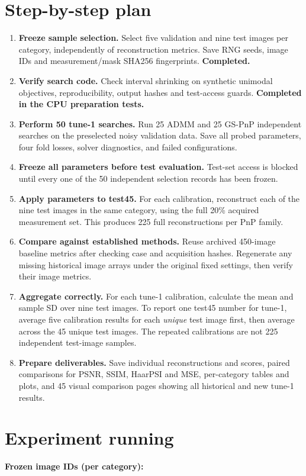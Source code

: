 \documentclass[10pt,a4paper]{article}
\begin{document}
\section{Step-by-step plan}
\begin{enumerate}
\item \textbf{Freeze sample selection.}
Select five validation and nine test images per category,
independently of reconstruction metrics. Save RNG seeds,
image IDs and measurement/mask SHA256 fingerprints.
\textbf{Completed.}
\item \textbf{Verify search code.}
Check interval shrinking on synthetic unimodal objectives,
reproducibility, output hashes and test-access guards.
\textbf{Completed in the CPU preparation tests.}
\item \textbf{Perform 50 tune-1 searches.}
Run 25 ADMM and 25 GS-PnP independent searches on the
preselected noisy validation data. Save all probed
parameters, four fold losses, solver diagnostics,
and failed configurations.
\item \textbf{Freeze all parameters before test evaluation.}
Test-set access is blocked until every one of the 50
independent selection records has been frozen.
\item \textbf{Apply parameters to test45.}
For each calibration, reconstruct each of the nine
test images in the same category, using the full
20\% acquired measurement set. This produces
225 full reconstructions per PnP family.
\item \textbf{Compare against established methods.}
Reuse archived 450-image baseline metrics after checking
case and acquisition hashes. Regenerate any missing
historical image arrays under the original fixed settings,
then verify their image metrics.
\item \textbf{Aggregate correctly.}
For each tune-1 calibration, calculate the mean and
sample SD over nine test images. To report one
test45 number for tune-1, average five calibration
results for each \emph{unique} test image first,
then average across the 45 unique test images.
The repeated calibrations are not 225 independent
test-image samples.
\item \textbf{Prepare deliverables.}
Save individual reconstructions and scores, paired
comparisons for PSNR, SSIM, HaarPSI and MSE, per-category
tables and plots, and 45 visual comparison pages
showing all historical and new tune-1 results.
\end{enumerate}

\section{Experiment running}
\textbf{Frozen image IDs (per category):}

\end{document}
